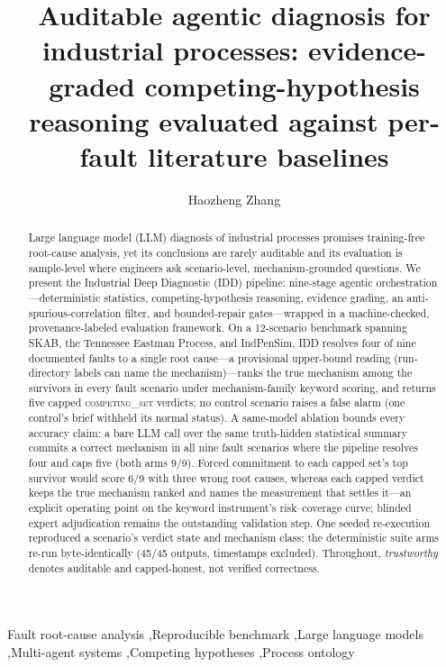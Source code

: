 \documentclass[preprint,10pt]{elsarticle}
\begin{document}
\title{Auditable agentic diagnosis for industrial processes: evidence-graded competing-hypothesis reasoning evaluated against per-fault literature baselines}

\author[ustc]{Haozheng Zhang}
\address[ustc]{Institute of Advanced Technology, University of Science and Technology of China, Hefei 230088, China}

\begin{frontmatter}
\begin{abstract}
Large language model (LLM) diagnosis of industrial processes promises training-free root-cause analysis, yet its conclusions are rarely auditable and its evaluation is sample-level where engineers ask scenario-level, mechanism-grounded questions. We present the Industrial Deep Diagnostic (IDD) pipeline: nine-stage agentic orchestration---deterministic statistics, competing-hypothesis reasoning, evidence grading, an anti-spurious-correlation filter, and bounded-repair gates---wrapped in a machine-checked, provenance-labeled evaluation framework. On a 12-scenario benchmark spanning SKAB, the Tennessee Eastman Process, and IndPenSim, IDD resolves four of nine documented faults to a single root cause---a provisional upper-bound reading (run-directory labels can name the mechanism)---ranks the true mechanism among the survivors in every fault scenario under mechanism-family keyword scoring, and returns five capped \mbox{\textsc{competing\_set}} verdicts; no control scenario raises a false alarm (one control's brief withheld its normal status). A same-model ablation bounds every accuracy claim: a bare LLM call over the same truth-hidden statistical summary commits a correct mechanism in all nine fault scenarios where the pipeline resolves four and caps five (both arms 9/9). Forced commitment to each capped set's top survivor would score 6/9 with three wrong root causes, whereas each capped verdict keeps the true mechanism ranked and names the measurement that settles it---an explicit operating point on the keyword instrument's risk--coverage curve; blinded expert adjudication remains the outstanding validation step. One seeded re-execution reproduced a scenario's verdict state and mechanism class; the deterministic suite arms re-run byte-identically (45/45 outputs, timestamps excluded). Throughout, \emph{trustworthy} denotes auditable and capped-honest, not verified correctness.
\end{abstract}

\begin{keyword}
Fault root-cause analysis \sep Reproducible benchmark \sep Large language models \sep Multi-agent systems \sep Competing hypotheses \sep Process ontology
\end{keyword}

\end{frontmatter}
\end{document}
